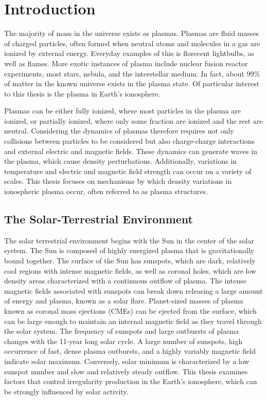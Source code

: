 
\chapter{Introduction}
\label{sec:introduction}

The majority of mass in the universe exists as plasmas.  Plasmas are fluid masses of charged particles, often formed when neutral atoms and molecules in a gas are ionized by external energy.  Everyday examples of this is florecent lightbulbs, as well as flames.  More exotic instances of plasma include nuclear fusion reactor experiments, most stars, nebula, and the interstellar medium.  In fact, about 99\% of matter in the known universe exists in the plasma state.  Of particular interest to this thesis is the plasma in Earth's ionosphere.

Plasmas can be either fully ionized, where most particles in the plasma are ionized, or partially ionized, where only some fraction are ionized and the rest are neutral.  Considering the dynamics of plasmas therefore requires not only collisions between particles to be considered but also charge-charge interactions and external electric and magnetic fields.  These dynamics can generate waves in the plasma, which cause density perturbations.  Additionally, variations in temperature and electric and magnetic field strength can occur on a variety of scales.  This thesis focuses on mechanisms by which density variations in ionospheric plasma occur, often referred to as plasma structures.

\section{The Solar-Terrestrial Environment}
The solar terrestrial environment begins with the Sun in the center of the solar system.  The Sun is composed of highly energized plasma that is gravitationally bound together.  The surface of the Sun has sunspots, which are dark, relatively cool regions with intense magnetic fields, as well as coronal holes, which are low density areas characterized with a continuous outflow of plasma.  The intense magnetic fields associated with sunspots can break down releasing a large amount of energy and plasma, known as a solar flare.  Planet-sized masses of plasma known as coronal mass ejections (CMEs) can be ejected from the surface, which can be large enough to maintain an internal magnetic field as they travel through the solar system.  The frequency of sunspots and large outbursts of plasma changes with the 11-year long solar cycle.  A large number of sunspots, high occurrence of fast, dense plasma outbursts, and a highly variably magnetic field indicate solar maximum.  Conversely, solar minimum is characterized by a low sunspot number and slow and relatively steady outflow.  This thesis examines factors that control irregularity production in the Earth's ionosphere, which can be strongly influenced by solar activity.


